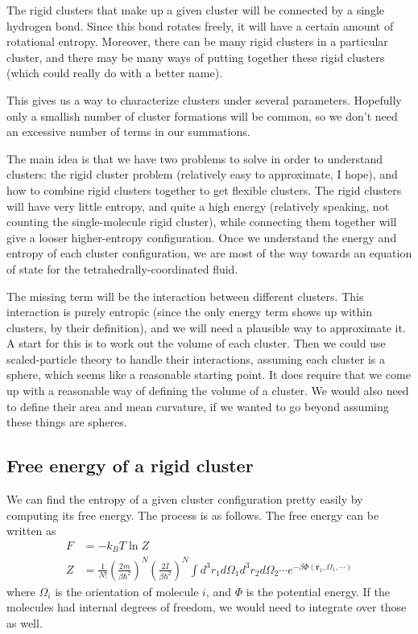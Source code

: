 \documentclass[letterpaper,twocolumn,amsmath,amssymb,pre]{revtex4-1}
\newcommand{\rr}{\textbf{r}}
\begin{document}
The rigid clusters that make up a given cluster will be connected by a
single hydrogen bond.  Since this bond rotates freely, it will have a
certain amount of rotational entropy.  Moreover, there can be many
rigid clusters in a particular cluster, and there may be many ways of
putting together these rigid clusters (which could really do with a
better name).

This gives us a way to characterize clusters under several
parameters.  Hopefully only a smallish number of cluster formations
will be common, so we don't need an excessive number of terms in our
summations.

The main idea is that we have two problems to solve in order to
understand clusters: the rigid cluster problem (relatively easy to
approximate, I hope), and how to combine rigid clusters together to
get flexible clusters.  The rigid clusters will have very little
entropy, and quite a high energy (relatively speaking, not counting
the single-molecule rigid cluster), while connecting them together
will give a looser higher-entropy configuration.  Once we understand
the energy and entropy of each cluster configuration, we are most of
the way towards an equation of state for the tetrahedrally-coordinated
fluid.

The missing term will be the interaction between different clusters.
This interaction is purely entropic (since the only energy term shows
up within clusters, by their definition), and we will need a plausible
way to approximate it.  A start for this is to work out the volume of
each cluster.  Then we could use scaled-particle theory to handle
their interactions, assuming each cluster is a sphere, which seems
like a reasonable starting point.  It does require that we come up
with a reasonable way of defining the volume of a cluster.  We would
also need to define their area and mean curvature, if we wanted to go
beyond assuming these things are spheres.

\subsection{Free energy of a rigid cluster}

We can find the entropy of a given cluster configuration pretty easily
by computing its free energy.  The process is as follows.  The free
energy can be written as
\newcommand\dr{d^3r}
\begin{align}
  F &= -k_BT \ln Z \\
  Z &=
  \frac{1}{N!}
  \left(\frac{2m}{\beta\hbar^2}\right)^N
  \left(\frac{2I}{\beta\hbar^2}\right)^N
  \int \dr_1d\Omega_1\dr_2d\Omega_2\cdots e^{-\beta
    \Phi(\rr_1,\Omega_1,\cdots)}
\end{align}
where $\Omega_i$ is the orientation of molecule $i$, and $\Phi$ is the
potential energy.  If the molecules had internal degrees of freedom,
we would need to integrate over those as well.
\end{document}
